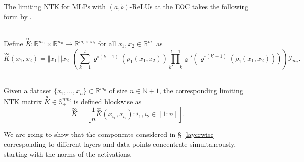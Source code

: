 \documentclass[twoside,11pt]{article}
\newcommand{\R}{\mathbb{R}}
\newcommand{\N}{\mathbb{N}}
\newcommand{\Id}{\mathcal{I}}
\newcommand{\limiting}[1]{\overset{\scriptscriptstyle\infty}{#1}}
\begin{document}
The limiting NTK for MLPs with $(a,b)$-ReLUs at the EOC takes the following form by \citet[Proposition~10]{mlpsateoc1}.

\begin{definition}~\\
Define $\limiting{K} : \R^{m_0} \times \R^{m_0} \to \R^{m_l \times m_l}$ for all $x_1,x_2 \in \R^{m_0}$ as
\[
\limiting{K}(x_1,x_2) = \Vert x_1 \Vert \Vert x_2 \Vert \left( \sum_{k=1}^l \varrho^{\circ (k-1)}\left( \rho_1(x_1,x_2) \right) \prod_{k'=k}^{l-1} \varrho'\left( \varrho^{\circ (k'-1)}\left( \rho_1(x_1,x_2) \right) \right) \right) \Id_{m_l}.
\]
\end{definition}

\begin{definition}~\\
Given a dataset $\{x_1,\ldots,x_n\} \subset \R^{m_0}$ of size $n \in \N+1$, the corresponding limiting NTK matrix $\limiting{K} \in \mathbb{S}^{n m_l}_+$ is defined blockwise as 
\[
\limiting{K} = \left[ \frac{1}{n} \limiting{K}(x_{i_1},x_{i_2}) : i_1,i_2 \in [1:n] \right].
\]
\end{definition}

We are going to show that the components considered in \S~\ref{layerwise} corresponding to different layers and data points concentrate simultaneously, starting with the norms of the activations.
\end{document}
